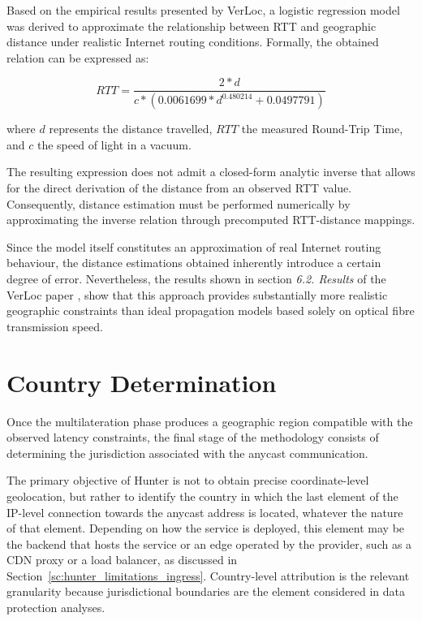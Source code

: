 Based on the empirical results presented by VerLoc, a logistic regression model was derived to approximate the relationship between RTT and geographic distance under realistic Internet routing conditions. Formally, the obtained relation can be expressed as:

\begin{equation*}
    RTT = \frac{2*d}{c*(0.0061699 * d^{0.480214} + 0.0497791)}
\end{equation*}

where $d$ represents the distance travelled, $RTT$ the measured Round-Trip Time, and $c$ the speed of light in a vacuum.

The resulting expression does not admit a closed-form analytic inverse that allows for the direct derivation of the distance from an observed RTT value. Consequently, distance estimation must be performed numerically by approximating the inverse relation through precomputed RTT-distance mappings.

Since the model itself constitutes an approximation of real Internet routing behaviour, the distance estimations obtained inherently introduce a certain degree of error. Nevertheless, the results shown in section \textit{6.2. Results} of the VerLoc paper \cite{Kohls2022VerLoc:Systems}, show that this approach provides substantially more realistic geographic constraints than ideal propagation models based solely on optical fibre transmission speed.

\section{Country Determination}
\label{sc:hunter_country_determination}

Once the multilateration phase produces a geographic region compatible with the observed latency constraints, the final stage of the methodology consists of determining the jurisdiction associated with the anycast communication.

The primary objective of Hunter is not to obtain precise coordinate-level geolocation, but rather to identify the country in which the last element of the IP-level connection towards the anycast address is located, whatever the nature of that element. Depending on how the service is deployed, this element may be the backend that hosts the service or an edge operated by the provider, such as a CDN proxy or a load balancer, as discussed in Section~\ref{sc:hunter_limitations_ingress}. Country-level attribution is the relevant granularity because jurisdictional boundaries are the element considered in data protection analyses.

